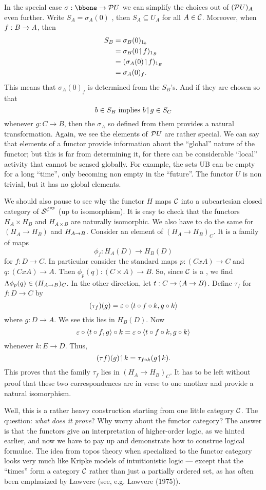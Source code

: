 In the special case $\sigma :\bbone \to \PU$ we can simplify the choices out of $(\mathcal P U)_A$
even further. Write $S_A= \sigma_A(0)$ , then $S_A\subseteq U_A$ for all $A \in \mathcal C$.
Moreover, when $f: B \rightarrow A$, then
\begin{align*}
S_B &= \sigma_B(0)_{{\mathrm 1}_b}\\
&= \sigma_B(0 \!\upharpoonleft\! f)_{{\mathrm 1} _B}\\
&= (\sigma_A(0) \!\upharpoonleft\! f)_{{\mathrm 1} _B}\\
&= \sigma_A(0)_f .
\end{align*}
This means that $\sigma_A(0)_f$ is determined from the $S_B$'s. And if they are chosen so
that
$$
b \in S_B {\textrm{ implies }} b \!\upharpoonleft\! g \in S_C
$$
whenever $g: C\to B$, then the $\sigma_A$ so defined from them provides a natural
transformation. Again, we see the elements of $\mathcal P U$ are rather special. We can say that
elements of a functor provide information about the ``global'' nature of the functor; but
this is far from determining it, for there can be considerable ``local'' activity that
cannot be sensed globally. For example, the sets UB can be empty for a long ``time'', only
becoming non empty in the ``future''. The functor $U$ is non trivial, but it has no global
elements.

We should also pause to see why the functor $H$ maps $\mathcal C$ into a subcartesian closed
category of $\mathcal S^{\mathcal C^{op}}$ (up to isomorphism). It is easy to check that the functors $H_A \times
H_B$ and $H_{A \times B}$ are naturally isomorphic. We also have to do the same for $(H_A
\to H_B)$ and $H_{A \rightarrow B}$. Consider an element of $(H_A\to H_B)_C$. It is a family of maps
$$
\phi_f : H_A(D) \to H_B(D)
$$
for $f: D\to C$. In particular consider the standard maps $p: (C x A) \to C$ and $q : (C x
A)\to A$. Then $\phi_p(q) : (C \times A)\to B$. So, since $\mathcal C$ is a \ccc, we find
$\Lambda\phi_p(q) \in (H_{A \rightarrow B})_C$. In the other direction, let $t : C\rightarrow (A \rightarrow B)$. Define
$\tau_f$ for $f : D\to C$ by
$$
(\tau_f)(g) = \varepsilon \circ \langle t \circ f \circ k, g \circ k \rangle
$$
where $g : D \to A$. We see this lies in $H_B(D)$. Now
$$
\varepsilon \circ \langle t \circ f, g\rangle \circ k = \varepsilon \circ \langle t \circ f \circ k, g \circ k\rangle
$$
whenever $k: E \to D$. Thus,
$$
(\tau f)(g) \!\upharpoonleft\! k = \tau_{f \circ k}(g \!\upharpoonleft\! k).
$$
This proves that the family $\tau_f$ lies in $(H_A \to H_B)_C$. It has to be left without
proof that these two correspondences are in verse to one another and provide a natural
isomorphism.

Well, this is a rather heavy construction starting from one little category $\mathcal C$. The
question: {\it what does it prove}? Why worry about the functor category? The answer is
that the functors give an interpretation of higher-order logic, as we hinted earlier, and
now we have to pay up and demonstrate how to construe logical formulae. The idea from
topos theory when specialized to the functor category looks very much like Kripke models
of intuitionistic logic --- except that the ``times'' form a category $\mathcal C$ rather than
just a partially ordered set, as has often been emphasized by Lawvere (see, e.g. Lawvere
(1975)).

